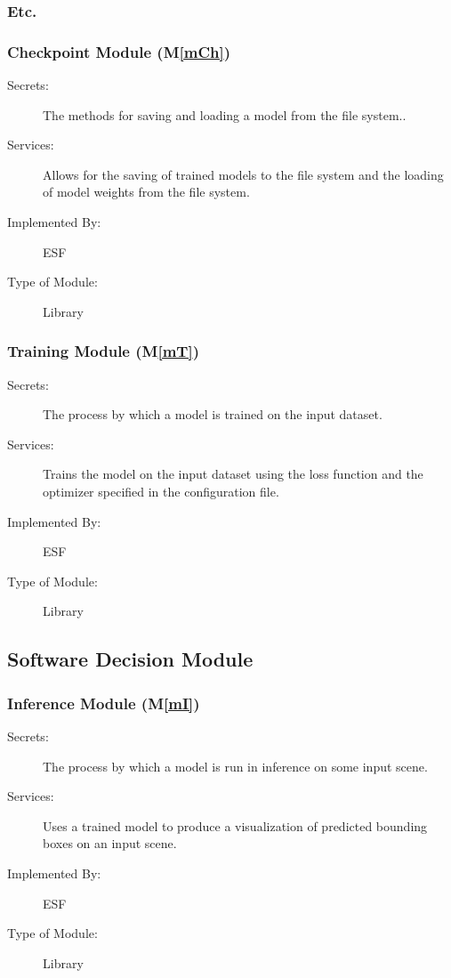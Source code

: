 \documentclass[12pt, titlepage]{article}
\newcommand{\ProjectName}{ESF }
\newcommand{\mref}[1]{M\ref{#1}}
\begin{document}
\subsubsection{Etc.}

\subsubsection{Checkpoint Module (\mref{mCh})}
\begin{description}
\item[Secrets:] The methods for saving and loading a model from the file system..
\item[Services:] Allows for the saving of trained models to the file system and the loading of model weights from the file system.
\item[Implemented By:] \ProjectName{}
\item[Type of Module:] Library
\end{description}

\subsubsection{Training Module (\mref{mT})}
\begin{description}
\item[Secrets:] The process by which a model is trained on the input dataset.
\item[Services:] Trains the model on the input dataset using the loss function and the optimizer specified in the configuration file.
\item[Implemented By:] \ProjectName{}
\item[Type of Module:] Library
\end{description}
\subsection{Software Decision Module}

\subsubsection{Inference Module (\mref{mI})}
\begin{description}
\item[Secrets:] The process by which a model is run in inference on some input scene.
\item[Services:] Uses a trained model to produce a visualization of predicted bounding boxes on an input scene.
\item[Implemented By:] \ProjectName{}
\item[Type of Module:] Library
\end{description}
\end{document}
